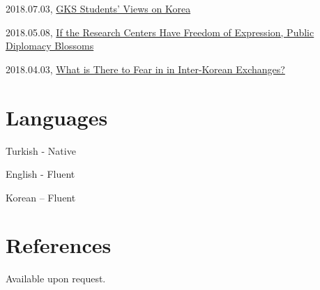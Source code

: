 \documentclass[11pt,a4paper,]{awesome-cv}
\begin{document}
2018.07.03,
\href{http://www.donga.com/news/List/Series_70040100000265/article/all/20180703/90869259/1}{GKS
Students' Views on Korea}

2018.05.08,
\href{http://www.donga.com/news/List/Series_70040100000265/article/all/20180508/89969581/1}{If
the Research Centers Have Freedom of Expression, Public Diplomacy
Blossoms}

2018.04.03,
\href{http://www.donga.com/news/List/Series_70040100000265/article/all/20180403/89427899/1}{What
is There to Fear in in Inter-Korean Exchanges?}

\hypertarget{languages}{%
\section{Languages}\label{languages}}

Turkish - Native

English - Fluent

Korean -- Fluent

\hypertarget{references}{%
\section{References}\label{references}}

Available upon request.
\end{document}
